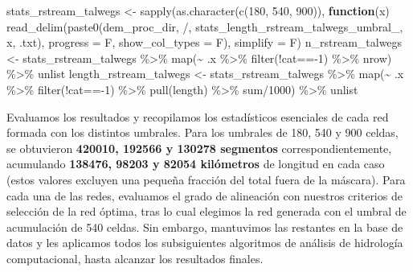 \documentclass[spanish]{article}
\newenvironment{Shaded}{\begin{snugshade}}{\end{snugshade}}
\newcommand{\AttributeTok}[1]{\textcolor[rgb]{0.77,0.63,0.00}{#1}}
\newcommand{\ControlFlowTok}[1]{\textcolor[rgb]{0.13,0.29,0.53}{\textbf{#1}}}
\newcommand{\DecValTok}[1]{\textcolor[rgb]{0.00,0.00,0.81}{#1}}
\newcommand{\FunctionTok}[1]{\textcolor[rgb]{0.00,0.00,0.00}{#1}}
\newcommand{\NormalTok}[1]{#1}
\newcommand{\OtherTok}[1]{\textcolor[rgb]{0.56,0.35,0.01}{#1}}
\newcommand{\SpecialCharTok}[1]{\textcolor[rgb]{0.00,0.00,0.00}{#1}}
\newcommand{\StringTok}[1]{\textcolor[rgb]{0.31,0.60,0.02}{#1}}
\begin{document}
\begin{Shaded}
\begin{Highlighting}[]
\NormalTok{stats\_rstream\_talwegs }\OtherTok{\textless{}{-}} \FunctionTok{sapply}\NormalTok{(}\FunctionTok{as.character}\NormalTok{(}\FunctionTok{c}\NormalTok{(}\DecValTok{180}\NormalTok{, }\DecValTok{540}\NormalTok{, }\DecValTok{900}\NormalTok{)), }\ControlFlowTok{function}\NormalTok{(x) }
  \FunctionTok{read\_delim}\NormalTok{(}\FunctionTok{paste0}\NormalTok{(dem\_proc\_dir, }\StringTok{\textquotesingle{}/\textquotesingle{}}\NormalTok{, }\StringTok{\textquotesingle{}stats\_length\_rstream\_talwegs\_umbral\_\textquotesingle{}}\NormalTok{, x, }\StringTok{\textquotesingle{}.txt\textquotesingle{}}\NormalTok{),}
             \AttributeTok{progress =}\NormalTok{ F, }\AttributeTok{show\_col\_types =}\NormalTok{ F), }\AttributeTok{simplify =}\NormalTok{ F)}
\NormalTok{n\_rstream\_talwegs }\OtherTok{\textless{}{-}}\NormalTok{ stats\_rstream\_talwegs }\SpecialCharTok{\%\textgreater{}\%} 
  \FunctionTok{map}\NormalTok{(}\SpecialCharTok{\textasciitilde{}}\NormalTok{ .x }\SpecialCharTok{\%\textgreater{}\%} \FunctionTok{filter}\NormalTok{(}\SpecialCharTok{!}\NormalTok{cat}\SpecialCharTok{=={-}}\DecValTok{1}\NormalTok{) }\SpecialCharTok{\%\textgreater{}\%}\NormalTok{ nrow) }\SpecialCharTok{\%\textgreater{}\%}\NormalTok{ unlist}
\NormalTok{length\_rstream\_talwegs }\OtherTok{\textless{}{-}}\NormalTok{ stats\_rstream\_talwegs }\SpecialCharTok{\%\textgreater{}\%}
  \FunctionTok{map}\NormalTok{(}\SpecialCharTok{\textasciitilde{}}\NormalTok{ .x }\SpecialCharTok{\%\textgreater{}\%} \FunctionTok{filter}\NormalTok{(}\SpecialCharTok{!}\NormalTok{cat}\SpecialCharTok{=={-}}\DecValTok{1}\NormalTok{) }\SpecialCharTok{\%\textgreater{}\%} \FunctionTok{pull}\NormalTok{(length) }\SpecialCharTok{\%\textgreater{}\%}\NormalTok{ sum}\SpecialCharTok{/}\DecValTok{1000}\NormalTok{) }\SpecialCharTok{\%\textgreater{}\%}\NormalTok{ unlist}
\end{Highlighting}
\end{Shaded}

Evaluamos los resultados y recopilamos los estadísticos esenciales de
cada red formada con los distintos umbrales. Para los umbrales de 180,
540 y 900 celdas, se obtuvieron \textbf{420010, 192566 y 130278
segmentos} correspondientemente, acumulando \textbf{138476, 98203 y
82054 kilómetros} de longitud en cada caso (estos valores excluyen una
pequeña fracción del total fuera de la máscara). Para cada una de las
redes, evaluamos el grado de alineación con nuestros criterios de
selección de la red óptima, tras lo cual elegimos la red generada con el
umbral de acumulación de 540 celdas. Sin embargo, mantuvimos las
restantes en la base de datos y les aplicamos todos los subsiguientes
algoritmos de análisis de hidrología computacional, hasta alcanzar los
resultados finales.
\end{document}
